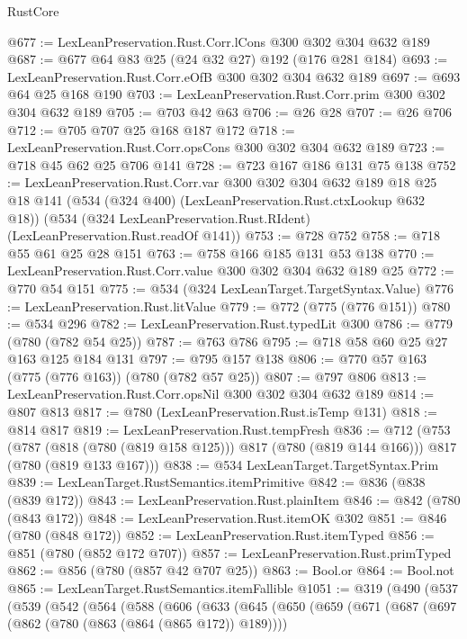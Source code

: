 \begin{lexlean}{RustCore}
\begin{coremodule}
@677 := LexLeanPreservation.Rust.Corr.lCons @300 @302 @304 @632 @189
@687 := @677 @64 @83 @25 (@24 @32 @27) @192 (@176 @281 @184)
@693 := LexLeanPreservation.Rust.Corr.eOfB @300 @302 @304 @632 @189
@697 := @693 @64 @25 @168 @190
@703 := LexLeanPreservation.Rust.Corr.prim @300 @302 @304 @632 @189
@705 := @703 @42 @63
@706 := @26 @28
@707 := @26 @706
@712 := @705 @707 @25 @168 @187 @172
@718 := LexLeanPreservation.Rust.Corr.opsCons @300 @302 @304 @632 @189
@723 := @718 @45 @62 @25 @706 @141
@728 := @723 @167 @186 @131 @75 @138
@752 := LexLeanPreservation.Rust.Corr.var
    @300
    @302
    @304
    @632
    @189
    @18
    @25
    @18
    @141
    (@534 (@324 @400) (LexLeanPreservation.Rust.ctxLookup @632 @18))
    (@534 (@324 LexLeanPreservation.Rust.RIdent) (LexLeanPreservation.Rust.readOf @141))
@753 := @728 @752
@758 := @718 @55 @61 @25 @28 @151
@763 := @758 @166 @185 @131 @53 @138
@770 := LexLeanPreservation.Rust.Corr.value @300 @302 @304 @632 @189 @25
@772 := @770 @54 @151
@775 := @534 (@324 LexLeanTarget.TargetSyntax.Value)
@776 := LexLeanPreservation.Rust.litValue
@779 := @772 (@775 (@776 @151))
@780 := @534 @296
@782 := LexLeanPreservation.Rust.typedLit @300
@786 := @779 (@780 (@782 @54 @25))
@787 := @763 @786
@795 := @718 @58 @60 @25 @27 @163 @125 @184 @131
@797 := @795 @157 @138
@806 := @770 @57 @163 (@775 (@776 @163)) (@780 (@782 @57 @25))
@807 := @797 @806
@813 := LexLeanPreservation.Rust.Corr.opsNil @300 @302 @304 @632 @189
@814 := @807 @813
@817 := @780 (LexLeanPreservation.Rust.isTemp @131)
@818 := @814 @817
@819 := LexLeanPreservation.Rust.tempFresh
@836 := @712
    (@753
      (@787 (@818 (@780 (@819 @158 @125))) @817 (@780 (@819 @144 @166)))
      @817
      (@780 (@819 @133 @167)))
@838 := @534 LexLeanTarget.TargetSyntax.Prim
@839 := LexLeanTarget.RustSemantics.itemPrimitive
@842 := @836 (@838 (@839 @172))
@843 := LexLeanPreservation.Rust.plainItem
@846 := @842 (@780 (@843 @172))
@848 := LexLeanPreservation.Rust.itemOK @302
@851 := @846 (@780 (@848 @172))
@852 := LexLeanPreservation.Rust.itemTyped
@856 := @851 (@780 (@852 @172 @707))
@857 := LexLeanPreservation.Rust.primTyped
@862 := @856 (@780 (@857 @42 @707 @25))
@863 := Bool.or
@864 := Bool.not
@865 := LexLeanTarget.RustSemantics.itemFallible
@1051 := @319
    (@490
      (@537
        (@539
          (@542
            (@564
              (@588
                (@606
                  (@633
                    (@645
                      (@650
                        (@659
                          (@671
                            (@687
                              (@697 (@862 (@780 (@863 (@864 (@865 @172)) @189))))

\end{coremodule}
\end{lexlean}
